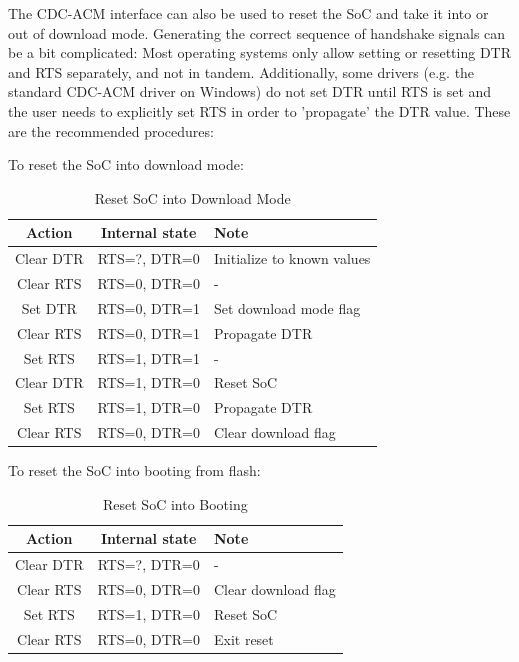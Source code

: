 \documentclass[main\_\_EN.tex]{subfiles}
\begin{document}
The CDC-ACM interface can also be used to reset the SoC and take it into or out of download mode. Generating the correct sequence of handshake signals can be a bit complicated: Most operating systems only allow setting or resetting DTR and RTS separately, and not in tandem. Additionally, some drivers (e.g. the standard CDC-ACM driver on Windows) do not set DTR until RTS is set and the user needs to explicitly set RTS in order to 'propagate' the DTR value. These are the recommended procedures:

To reset the SoC into download mode:

\begin{table}[H]
    \centering
    \caption{Reset SoC into Download Mode}
    \label{tab:usbserialjtag-reset-soc-into-download-mode}
    \begin{tabular} {|c|c|l|}
    \hline
        \rowcolor{lightgray}
        \textbf{Action} & \textbf{Internal state} & \textbf{Note} \\\hline
        
        Clear DTR & RTS=?, DTR=0 & Initialize to known values \\\hline
        Clear RTS & RTS=0, DTR=0 & - \\\hline
        Set DTR & RTS=0, DTR=1 & Set download mode flag \\\hline
        Clear RTS & RTS=0, DTR=1 & Propagate DTR \\\hline
        Set RTS & RTS=1, DTR=1 & - \\\hline
        Clear DTR & RTS=1, DTR=0 & Reset SoC \\\hline
        Set RTS & RTS=1, DTR=0 & Propagate DTR \\\hline
        Clear RTS & RTS=0, DTR=0 & Clear download flag\\\hline
    \end{tabular}
\end{table}

To reset the SoC into booting from flash:

\begin{table}[H]
    \centering
    \caption{Reset SoC into Booting}
    \label{tab:usbserialjtag-reset-soc-into-booting}
    \begin{tabular} {|c|c|l|}
    \hline
        \rowcolor{lightgray}
        \textbf{Action} & \textbf{Internal state} & \textbf{Note} \\\hline
        
        Clear DTR & RTS=?, DTR=0 & - \\\hline
        Clear RTS & RTS=0, DTR=0 &  Clear download flag \\\hline
        Set RTS & RTS=1, DTR=0 & Reset SoC \\\hline
        Clear RTS & RTS=0, DTR=0 & Exit reset \\\hline
    \end{tabular}
\end{table}
\end{document}
